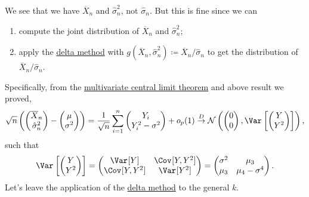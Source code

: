We see that we have \(\overline{X} _n\) and \(\hat{\sigma} _n^2\), not \(\hat{\sigma} _n\). But this is fine since we can
\begin{enumerate}
	\item compute the joint distribution of \(\overline{X} _n\) and \(\hat{\sigma} _n^2\);
	\item apply the \hyperref[thm:delta-method]{delta method} with \(g(\overline{X} _n , \hat{\sigma} _ n^2) \coloneqq \overline{X} _n / \hat{\sigma} _n\) to get the distribution of \(\overline{X} _n / \hat{\sigma} _n\).
\end{enumerate}
Specifically, from the \hyperref[thm:multivariate-CLT]{multivariate central limit theorem} and above result we proved,
\[
	\sqrt{n} \left( \begin{pmatrix}
			\overline{X} _n   \\
			\hat{\sigma} _n^2 \\
		\end{pmatrix} - \begin{pmatrix}
			\mu       \\
			\sigma ^2 \\
		\end{pmatrix} \right)
	= \frac{1}{\sqrt{n} } \sum_{i=1}^{n} \begin{pmatrix}
		Y_i               \\
		Y_i^2 - \sigma ^2 \\
	\end{pmatrix} + o_p(1)
	\overset{D}{\to} \mathcal{N} \left( \begin{pmatrix}
		0 \\
		0 \\
	\end{pmatrix}, \Var_{}\left[\begin{pmatrix}
			Y   \\
			Y^2 \\
		\end{pmatrix} \right] \right),
\]
such that
\[
	\Var_{}\left[\begin{pmatrix}
			Y   \\
			Y^2 \\
		\end{pmatrix} \right]
	= \begin{pmatrix}
		\Var_{}[Y]      & \Cov_{}[Y, Y^2] \\
		\Cov_{}[Y, Y^2] & \Var_{}[Y^2]    \\
	\end{pmatrix}
	= \begin{pmatrix}
		\sigma ^2 & \mu _3             \\
		\mu _3    & \mu _4 - \sigma ^4 \\
	\end{pmatrix}.
\]
Let's leave the application of the \hyperref[thm:delta-method]{delta method} to the general \(k\).

